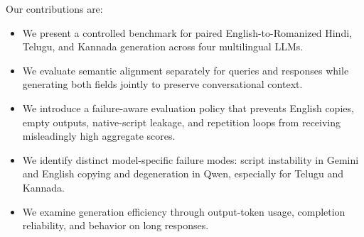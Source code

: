 Our contributions are:

\begin{itemize}
    \item We present a controlled benchmark for paired English-to-Romanized
    Hindi, Telugu, and Kannada generation across four multilingual LLMs.

    \item We evaluate semantic alignment separately for queries and responses
    while generating both fields jointly to preserve conversational context.

    \item We introduce a failure-aware evaluation policy that prevents English
    copies, empty outputs, native-script leakage, and repetition loops from
    receiving misleadingly high aggregate scores.

    \item We identify distinct model-specific failure modes: script instability
    in Gemini and English copying and degeneration in Qwen, especially for
    Telugu and Kannada.

    \item We examine generation efficiency through output-token usage,
    completion reliability, and behavior on long responses.
\end{itemize}